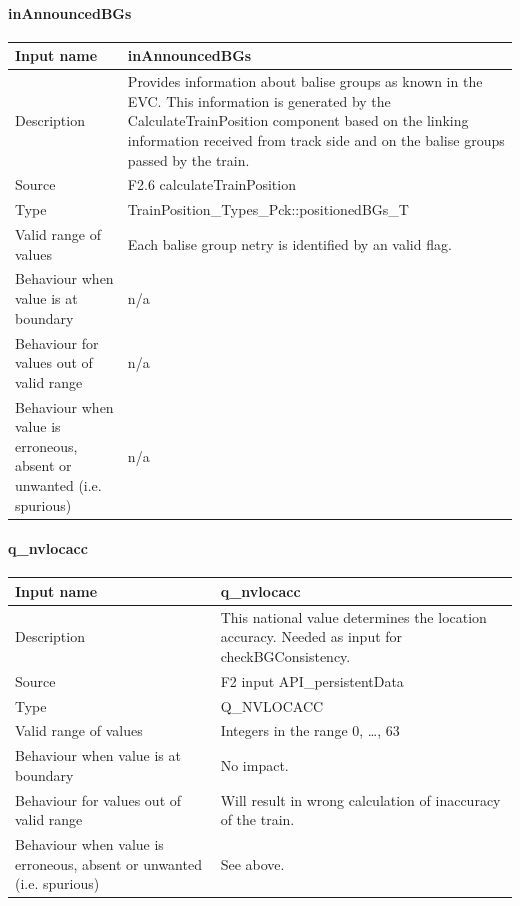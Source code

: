 \paragraph{inAnnouncedBGs}

\begin{longtable}{p{}p{}}
\toprule
Input name				& inAnnouncedBGs \\
\midrule
Description				& Provides information about balise groups as known in the EVC. This information is generated by the CalculateTrainPosition component based on the linking information received from track side and on the balise groups passed by the train.\\
\midrule
Source					& F2.6 calculateTrainPosition \\ 
\midrule
Type					& TrainPosition\_Types\_Pck::positionedBGs\_T \\
\midrule
Valid range of values	& Each balise group netry is identified by an valid flag. \\
\midrule
Behaviour when value is at boundary	& n/a\\
\midrule
Behaviour for values out of valid range	& n/a\\
\midrule
Behaviour when value is erroneous, absent or unwanted (i.e. spurious) & n/a\\
\bottomrule
\end{longtable}


\paragraph{q\_nvlocacc}

\begin{longtable}{p{}p{}}
\toprule
Input name				& q\_nvlocacc \\
\midrule
Description				& This national value determines the location accuracy. Needed as input for checkBGConsistency.  \\
\midrule
Source					& F2 input API\_persistentData\\ 
\midrule
Type					& Q\_NVLOCACC \\
\midrule
Valid range of values	& Integers in the range 0, \ldots, 63\\
\midrule
Behaviour when value is at boundary	& No impact.\\
\midrule
Behaviour for values out of valid range	& Will result in wrong calculation of inaccuracy of the train.\\
\midrule
Behaviour when value is erroneous, absent or unwanted (i.e. spurious) & See above.\\
\bottomrule
\end{longtable}


